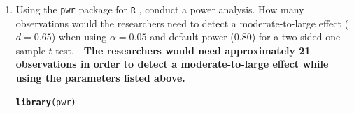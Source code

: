 \documentclass{article}\usepackage[]{graphicx}\usepackage[]{xcolor}
\makeatletter
\newcommand{\hldef}[1]{\textcolor[rgb]{0.345,0.345,0.345}{#1}}%
\newcommand{\hlkwd}[1]{\textcolor[rgb]{0.737,0.353,0.396}{\textbf{#1}}}%
\newenvironment{kframe}{%
 \def\at@end@of@kframe{}%
 \ifinner\ifhmode%
  \def\at@end@of@kframe{\end{minipage}}%
  \begin{minipage}{\columnwidth}%
 \fi\fi%
 \def\FrameCommand##1{\hskip\@totalleftmargin \hskip-\fboxsep
 \colorbox{shadecolor}{##1}\hskip-\fboxsep
     \hskip-\linewidth \hskip-\@totalleftmargin \hskip\columnwidth}%
 \MakeFramed {\advance\hsize-\width
   \@totalleftmargin\z@ \linewidth\hsize
   \@setminipage}}%
 {\par\unskip\endMakeFramed%
 \at@end@of@kframe}
\newenvironment{knitrout}{}{} %
\makeatother
\begin{document}
\begin{enumerate}

\item Using the \texttt{pwr} package for \texttt{R} \citep{pwr},
conduct a power analysis. How many observations would the researchers 
need to detect a moderate-to-large effect ($d=0.65$) when using 
$\alpha=0.05$ and default power (0.80) for a two-sided one sample 
$t$ test. - \textbf{The researchers would need approximately 21 observations in order to detect a moderate-to-large effect while using the parameters listed above.}

\begin{knitrout}\scriptsize
{}\color{fgcolor}\begin{kframe}
\begin{alltt}
\hlkwd{library}\hldef{(pwr)}
\end{alltt}



\end{kframe}
\end{knitrout}
\end{enumerate}
\end{document}
